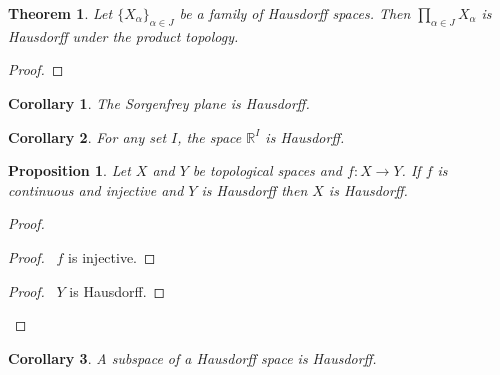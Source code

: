 \documentclass{report}
\let\qed\relax
\newtheorem{prop}[lm]{Proposition}
\newtheorem{thm}[lm]{Theorem}
\newtheorem{cor}{Corollary}[lm]
\theoremstyle{definition}
\begin{document}
  \begin{thm}
    \label{thm:topology:Hausdorff:product}
    Let $\{ X_\alpha \}_{\alpha \in J}$ be a family of Hausdorff spaces. Then
    $\prod_{\alpha \in J} X_\alpha$ is Hausdorff under the product topology.
  \end{thm}

  \begin{proof}
    \pf
    \qed
  \end{proof}

  \begin{cor}
   The Sorgenfrey plane is Hausdorff.
  \end{cor}

  \begin{cor}
  	For any set $I$,
    the space $\mathbb{R}^I$ is Hausdorff.
  \end{cor}

  \begin{prop}
    Let $X$ and $Y$ be topological spaces and $f : X \rightarrow Y$. If $f$ is
    continuous and injective and $Y$ is Hausdorff then $X$ is Hausdorff.
  \end{prop}

  \begin{proof}
    \pf
    \begin{proof}
      \pf\ $f$ is injective.
    \end{proof}
    \begin{proof}
      \pf\ $Y$ is Hausdorff.
    \end{proof}
    \qed
  \end{proof}

  \begin{cor}
    \label{cor:topology:Hausdorff:subspace}
    A subspace of a Hausdorff space is Hausdorff.
  \end{cor}
\end{document}
